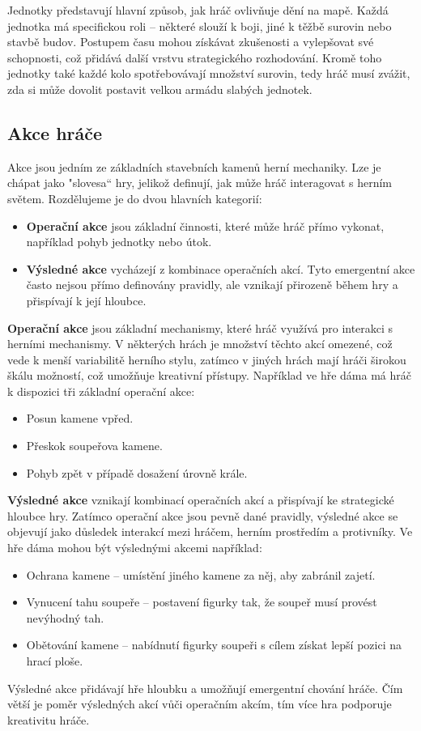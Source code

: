 Jednotky představují hlavní způsob, jak hráč ovlivňuje dění na mapě. Každá jednotka má specifickou roli – některé slouží k boji, jiné k těžbě surovin nebo stavbě budov. Postupem času mohou získávat zkušenosti a vylepšovat své schopnosti, což přidává další vrstvu strategického rozhodování. Kromě toho jednotky také každé kolo spotřebovávají množství surovin, tedy hráč musí zvážit, zda si může dovolit postavit velkou armádu slabých jednotek.


\subsection{Akce hráče}

Akce jsou jedním ze základních stavebních kamenů herní mechaniky. Lze je chápat jako "slovesa“ hry, jelikož definují, jak může hráč interagovat s herním světem. Rozdělujeme je do dvou hlavních kategorií:

\begin{itemize}
    \item \textbf{Operační akce} jsou základní činnosti, které může hráč přímo vykonat, například pohyb jednotky nebo útok.
    \item \textbf{Výsledné akce} vycházejí z kombinace operačních akcí. Tyto emergentní akce často nejsou přímo definovány pravidly, ale vznikají přirozeně během hry a přispívají k její hloubce.
\end{itemize}

\textbf{Operační akce} jsou základní mechanismy, které hráč využívá pro interakci s herními mechanismy. V některých hrách je množství těchto akcí omezené, což vede k menší variabilitě herního stylu, zatímco v jiných hrách mají hráči širokou škálu možností, což umožňuje kreativní přístupy. Například ve hře dáma má hráč k dispozici tři základní operační akce:
\begin{itemize}
    \item Posun kamene vpřed.
    \item Přeskok soupeřova kamene.
    \item Pohyb zpět v případě dosažení úrovně krále.
\end{itemize}

\textbf{Výsledné akce} vznikají kombinací operačních akcí a přispívají ke strategické hloubce hry. Zatímco operační akce jsou pevně dané pravidly, výsledné akce se objevují jako důsledek interakcí mezi hráčem, herním prostředím a protivníky. Ve hře dáma mohou být výslednými akcemi například:
\begin{itemize}
    \item Ochrana kamene -- umístění jiného kamene za něj, aby zabránil zajetí.
    \item Vynucení tahu soupeře -- postavení figurky tak, že soupeř musí provést nevýhodný tah.
    \item Obětování kamene -- nabídnutí figurky soupeři s cílem získat lepší pozici na hrací ploše.
\end{itemize}
Výsledné akce přidávají hře hloubku a umožňují emergentní chování hráče. Čím větší je poměr výsledných akcí vůči operačním akcím, tím více hra podporuje kreativitu hráče.

